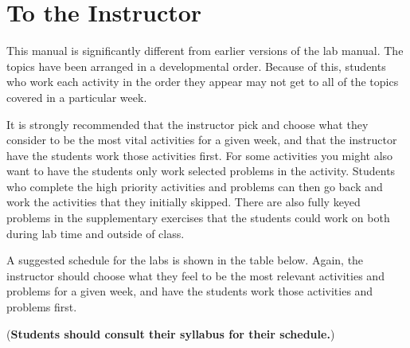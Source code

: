 \documentclass[10pt,oneside,]{book}
\theoremstyle{plain}
\theoremstyle{definition}
\numberwithin{equation}{section}
\begin{document}
\chapter*{To the Instructor}\label{to-the-instructor}
This manual is significantly different from earlier versions of the lab manual. The topics have been arranged in a developmental order. Because of this, students who work each activity in the order they appear may not get to all of the topics covered in a particular week.%
\par
It is strongly recommended that the instructor pick and choose what they consider to be the most vital activities for a given week, and that the instructor have the students work those activities first. For some activities you might also want to have the students only work selected problems in the activity. Students who complete the high priority activities and problems can then go back and work the activities that they initially skipped. There are also fully keyed problems in the supplementary exercises that the students could work on both during lab time and outside of class.%
\par
A suggested schedule for the labs is shown in the table below. Again, the instructor should choose what they feel to be the most relevant activities and problems for a given week, and have the students work those activities and problems first.%
\par
(\textbf{Students should consult their syllabus for their schedule.})%
\end{document}

